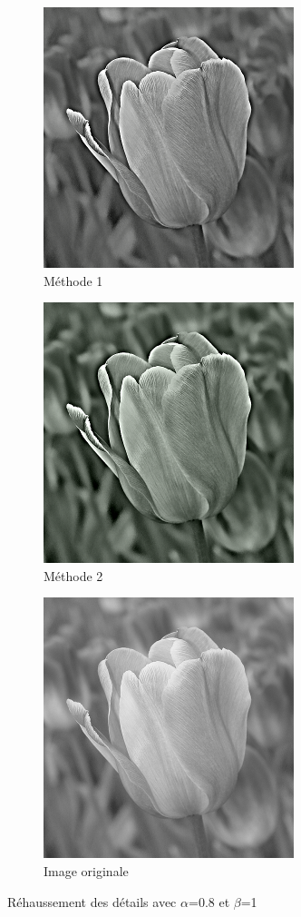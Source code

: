 \documentclass[twoside,UTF8]{EPURapport}
\begin{document}
\begin{figure}[H]
        \centering
        \begin{subfigure}[b]{0.3\textwidth}
                \includegraphics[scale=0.45]{images/flower1_08_1.png} 
                \caption{Méthode 1}
        \end{subfigure}
        \qquad \qquad
        \begin{subfigure}[b]{0.3\textwidth}
                \includegraphics[scale=0.45]{images/flower2_08_1.png}
                \caption{Méthode 2}
        \end{subfigure}
        
        \begin{subfigure}[b]{0.3\textwidth}
                \includegraphics[scale=0.45]{images/flower.png}
             	\caption{Image originale}
        \end{subfigure}
        \caption{Réhaussement des détails avec $\alpha$=0.8 et $\beta$=1 }
\end{figure}
\end{document}
